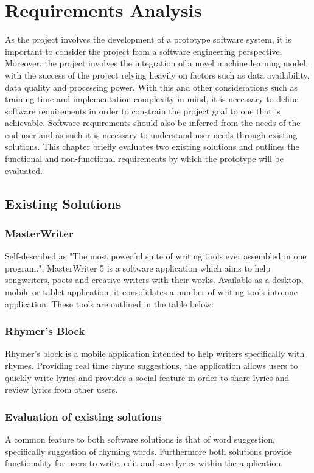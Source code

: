 \chapter{Requirements Analysis}
\label{chap:requirements_analysis}
As the project involves the development of a prototype software system, it is important to consider the project from a software engineering perspective. Moreover, the project involves the integration of a novel machine learning model, with the success of the project relying heavily on factors such as data availability, data quality and processing power. With this and other considerations such as training time and implementation complexity in mind, it is necessary to define software requirements in order to constrain the project goal to one that is achievable. Software requirements should also be inferred from the needs of the end-user and as such it is necessary to understand user needs through existing solutions. This chapter briefly evaluates two existing solutions and outlines the functional and non-functional requirements by which the prototype will be evaluated.
\section{Existing Solutions}
\subsection{MasterWriter}
Self-described as "The most powerful suite of writing tools ever assembled in one program.",
MasterWriter 5 is a software application which aims to help songwriters, poets and creative
writers with their works. Available as a desktop, mobile or tablet application, it consolidates a
number of writing tools into one application. These tools are outlined in the table below:


\subsection{Rhymer's Block}
Rhymer's block is a mobile application intended to help writers specifically with rhymes. Providing real time rhyme suggestions, the application allows users to quickly write lyrics and provides a social feature in order to share lyrics and review lyrics from other users.

\subsection{Evaluation of existing solutions}
A common feature to both software solutions is that of word suggestion, specifically suggestion of rhyming words. Furthermore both solutions provide functionality for users to write, edit and save lyrics within the application.
